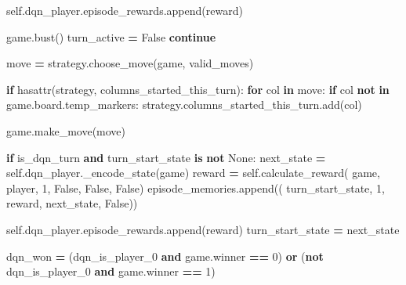 \documentclass[12pt]{article}
\newenvironment{Shaded}{\begin{snugshade}}{\end{snugshade}}
\newcommand{\BuiltInTok}[1]{#1}
\newcommand{\ControlFlowTok}[1]{\textcolor[rgb]{0.13,0.29,0.53}{\textbf{#1}}}
\newcommand{\DecValTok}[1]{\textcolor[rgb]{0.00,0.00,0.81}{#1}}
\newcommand{\KeywordTok}[1]{\textcolor[rgb]{0.13,0.29,0.53}{\textbf{#1}}}
\newcommand{\NormalTok}[1]{#1}
\newcommand{\OperatorTok}[1]{\textcolor[rgb]{0.81,0.36,0.00}{\textbf{#1}}}
\newcommand{\StringTok}[1]{\textcolor[rgb]{0.31,0.60,0.02}{#1}}
\newcommand{\VariableTok}[1]{\textcolor[rgb]{0.00,0.00,0.00}{#1}}
\begin{document}
\begin{thesis}
\begin{Shaded}
\begin{Highlighting}[]
                        \VariableTok{self}\NormalTok{.dqn\_player.episode\_rewards.append(reward)}

\NormalTok{                    game.bust()}
\NormalTok{                    turn\_active }\OperatorTok{=} \VariableTok{False}
                    \ControlFlowTok{continue}
                
\NormalTok{                move }\OperatorTok{=}\NormalTok{ strategy.choose\_move(game, valid\_moves)}
                
                \ControlFlowTok{if} \BuiltInTok{hasattr}\NormalTok{(strategy, }\StringTok{\textquotesingle{}columns\_started\_this\_turn\textquotesingle{}}\NormalTok{):}
                    \ControlFlowTok{for}\NormalTok{ col }\KeywordTok{in}\NormalTok{ move:}
                        \ControlFlowTok{if}\NormalTok{ col }\KeywordTok{not} \KeywordTok{in}\NormalTok{ game.board.temp\_markers:}
\NormalTok{                            strategy.columns\_started\_this\_turn.add(col)}
                
\NormalTok{                game.make\_move(move)}
                
                \ControlFlowTok{if}\NormalTok{ is\_dqn\_turn }\KeywordTok{and}\NormalTok{ turn\_start\_state }\KeywordTok{is} \KeywordTok{not} \VariableTok{None}\NormalTok{:}
\NormalTok{                    next\_state }\OperatorTok{=} \VariableTok{self}\NormalTok{.dqn\_player.\_encode\_state(game)}
\NormalTok{                    reward }\OperatorTok{=} \VariableTok{self}\NormalTok{.calculate\_reward(}
\NormalTok{                                      game, player, }\DecValTok{1}\NormalTok{, }\VariableTok{False}\NormalTok{, }\VariableTok{False}\NormalTok{, }\VariableTok{False}\NormalTok{)}
\NormalTok{                    episode\_memories.append((}
\NormalTok{                            turn\_start\_state, }\DecValTok{1}\NormalTok{, reward, next\_state, }\VariableTok{False}\NormalTok{))}

                    \VariableTok{self}\NormalTok{.dqn\_player.episode\_rewards.append(reward)}
\NormalTok{                    turn\_start\_state }\OperatorTok{=}\NormalTok{ next\_state}


        
\NormalTok{        dqn\_won }\OperatorTok{=}\NormalTok{ (dqn\_is\_player\_0 }\KeywordTok{and}\NormalTok{ game.winner }\OperatorTok{==} \DecValTok{0}\NormalTok{) }\KeywordTok{or} 
\NormalTok{                                (}\KeywordTok{not}\NormalTok{ dqn\_is\_player\_0 }\KeywordTok{and}\NormalTok{ game.winner }\OperatorTok{==} \DecValTok{1}\NormalTok{)}
        

\end{Highlighting}
\end{Shaded}
\end{thesis}
\end{document}
